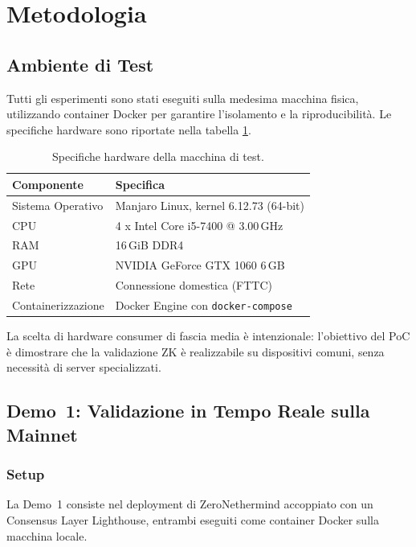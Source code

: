 \documentclass[12pt,a4paper,openright,twoside]{report}
\begin{document}
\section{Metodologia}\label{sec:metodologia}

\subsection{Ambiente di Test}\label{sec:ambiente_test}

Tutti gli esperimenti sono stati eseguiti sulla medesima macchina fisica, utilizzando container Docker per garantire l'isolamento e la riproducibilità. Le specifiche hardware sono riportate nella tabella \ref{tab:hardware}.
\\
\begin{table}[H]
\centering
\begin{tabular}{l l}
\hline
\textbf{Componente} & \textbf{Specifica} \\
\hline
Sistema Operativo & Manjaro Linux, kernel 6.12.73 (64-bit) \\
CPU & 4 x Intel Core i5-7400 @ 3.00\,GHz \\
RAM & 16\,GiB DDR4 \\
GPU & NVIDIA GeForce GTX 1060 6\,GB \\
Rete & Connessione domestica (FTTC) \\
Containerizzazione & Docker Engine con \texttt{docker-compose} \\
\hline
\end{tabular}
\caption{Specifiche hardware della macchina di test.}
\label{tab:hardware}
\end{table}

La scelta di hardware consumer di fascia media è intenzionale: l'obiettivo del PoC è dimostrare che la validazione ZK è realizzabile su dispositivi comuni, senza necessità di server specializzati.


\subsection{Demo~1: Validazione in Tempo Reale sulla Mainnet}\label{sec:demo1}

\subsubsection{Setup}

La Demo~1 consiste nel deployment di ZeroNethermind accoppiato con un Consensus Layer Lighthouse, entrambi eseguiti come container Docker sulla macchina locale.
\end{document}
